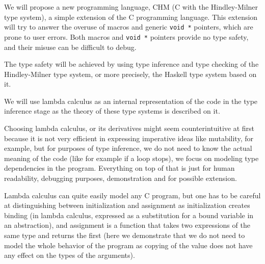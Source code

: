 

We will propose a new programming language, CHM (C with the Hindley-Milner type system), a simple extension of the C programming language. This extension will try to answer the overuse of macros and generic \lstinline{void *} pointers, which are prone to user errors. Both macros and \lstinline{void *} pointers provide no type safety, and their misuse can be difficult to debug.

The type safety will be achieved by using type inference and type checking of the Hindley-Milner type system, or more precisely, the Haskell type system based on it.

We will use lambda calculus as an internal representation of the code in the type inference stage as the theory of these type systems is described on it.

Choosing lambda calculus, or its derivatives might seem counterintuitive at first because it is not very efficient in expressing imperative ideas like mutability, for example, but for purposes of type inference, we do not need to know the actual meaning of the code (like for example if a loop stops), we focus on modeling type dependencies in the program. Everything on top of that is just for human readability, debugging purposes, demonstration and for possible extension.

Lambda calculus can quite easily model any C program, but one has to be careful at distinguishing between initialization and assignment as initialization creates binding (in lambda calculus, expressed as a substitution for a bound variable in an abstraction), and assignment is a function that takes two expressions of the same type and returns the first (here we demonstrate that we do not need to model the whole behavior of the program as copying of the value does not have any effect on the types of the arguments).
